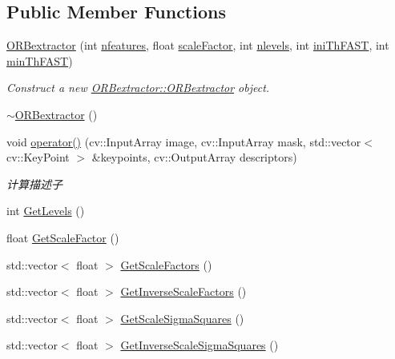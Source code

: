 \subsection*{Public Member Functions}
\begin{DoxyCompactItemize}
\item 
\mbox{\hyperlink{class_o_r_b___s_l_a_m2_1_1_o_r_bextractor_aaa8e010415e516246e171b9bbb9f84af}{O\+R\+Bextractor}} (int \mbox{\hyperlink{class_o_r_b___s_l_a_m2_1_1_o_r_bextractor_ab74b569810b3d3288c642cc48fd65c4c}{nfeatures}}, float \mbox{\hyperlink{class_o_r_b___s_l_a_m2_1_1_o_r_bextractor_a13b9c3883b3fb19cb756f841cb948908}{scale\+Factor}}, int \mbox{\hyperlink{class_o_r_b___s_l_a_m2_1_1_o_r_bextractor_aaf5c435dfb3fb2220c3847cd5f536e2f}{nlevels}}, int \mbox{\hyperlink{class_o_r_b___s_l_a_m2_1_1_o_r_bextractor_a8997b404b50b563ffd2aea6b8130dd2a}{ini\+Th\+F\+A\+ST}}, int \mbox{\hyperlink{class_o_r_b___s_l_a_m2_1_1_o_r_bextractor_a72fcac0df56c0bfe430475082df56823}{min\+Th\+F\+A\+ST}})
\begin{DoxyCompactList}\small\item\em Construct a new \mbox{\hyperlink{class_o_r_b___s_l_a_m2_1_1_o_r_bextractor_aaa8e010415e516246e171b9bbb9f84af}{O\+R\+Bextractor\+::\+O\+R\+Bextractor}} object. \end{DoxyCompactList}\item 
\mbox{\hyperlink{class_o_r_b___s_l_a_m2_1_1_o_r_bextractor_ab0e5801da8f6dee0261aef5cf19e73b3}{$\sim$\+O\+R\+Bextractor}} ()
\item 
void \mbox{\hyperlink{class_o_r_b___s_l_a_m2_1_1_o_r_bextractor_a05117a839e4261638b0413fff2dc9e1b}{operator()}} (cv\+::\+Input\+Array image, cv\+::\+Input\+Array mask, std\+::vector$<$ cv\+::\+Key\+Point $>$ \&keypoints, cv\+::\+Output\+Array descriptors)
\begin{DoxyCompactList}\small\item\em 计算描述子 \end{DoxyCompactList}\item 
int \mbox{\hyperlink{class_o_r_b___s_l_a_m2_1_1_o_r_bextractor_abaad86a9c65eed8a2f8af9604b1a53ee}{Get\+Levels}} ()
\item 
float \mbox{\hyperlink{class_o_r_b___s_l_a_m2_1_1_o_r_bextractor_a3352294ae4ae250a406140d2ae6f7286}{Get\+Scale\+Factor}} ()
\item 
std\+::vector$<$ float $>$ \mbox{\hyperlink{class_o_r_b___s_l_a_m2_1_1_o_r_bextractor_a977d96ed602e3a6ff036afc2f2f213fd}{Get\+Scale\+Factors}} ()
\item 
std\+::vector$<$ float $>$ \mbox{\hyperlink{class_o_r_b___s_l_a_m2_1_1_o_r_bextractor_aa56b36e338372ec7cba3945c9194da4a}{Get\+Inverse\+Scale\+Factors}} ()
\item 
std\+::vector$<$ float $>$ \mbox{\hyperlink{class_o_r_b___s_l_a_m2_1_1_o_r_bextractor_a8f574b3b1314c5aa645135cb2f3dca3c}{Get\+Scale\+Sigma\+Squares}} ()
\item 
std\+::vector$<$ float $>$ \mbox{\hyperlink{class_o_r_b___s_l_a_m2_1_1_o_r_bextractor_a1ddabdd67709d7df17000cc2966c47c7}{Get\+Inverse\+Scale\+Sigma\+Squares}} ()
\end{DoxyCompactItemize}
